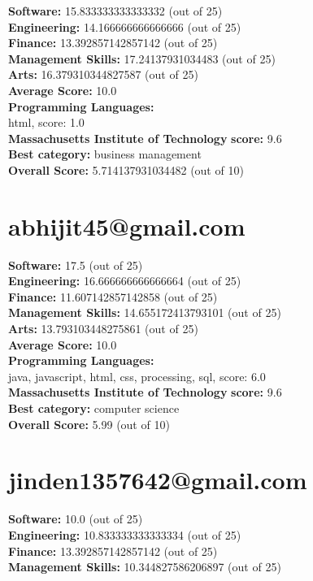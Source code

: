 \documentclass{article}
\begin{document}
\textbf{Software:} 15.833333333333332 (out of 25)\\
\textbf{Engineering: } 14.166666666666666 (out of 25)\\
\textbf{Finance:} 13.392857142857142 (out of 25)\\
\textbf{Management Skills:} 17.24137931034483 (out of 25)\\
\textbf{Arts:} 16.379310344827587 (out of 25)\\
\textbf{Average Score: } 10.0\\
\textbf{Programming Languages:} \\
html, score: 1.0\\
\textbf{Massachusetts Institute of Technology} \textbf{score:} 9.6\\
\textbf{Best category: } business management\\
\textbf{Overall Score: }5.714137931034482 (out of 10)\section{abhijit45@gmail.com}
\textbf{Software:} 17.5 (out of 25)\\
\textbf{Engineering: } 16.666666666666664 (out of 25)\\
\textbf{Finance:} 11.607142857142858 (out of 25)\\
\textbf{Management Skills:} 14.655172413793101 (out of 25)\\
\textbf{Arts:} 13.793103448275861 (out of 25)\\
\textbf{Average Score: } 10.0\\
\textbf{Programming Languages:} \\
java, javascript, html, css, processing, sql, score: 6.0\\
\textbf{Massachusetts Institute of Technology} \textbf{score:} 9.6\\
\textbf{Best category: } computer science\\
\textbf{Overall Score: }5.99 (out of 10)\section{jinden1357642@gmail.com}
\textbf{Software:} 10.0 (out of 25)\\
\textbf{Engineering: } 10.833333333333334 (out of 25)\\
\textbf{Finance:} 13.392857142857142 (out of 25)\\
\textbf{Management Skills:} 10.344827586206897 (out of 25)\\
\end{document}
